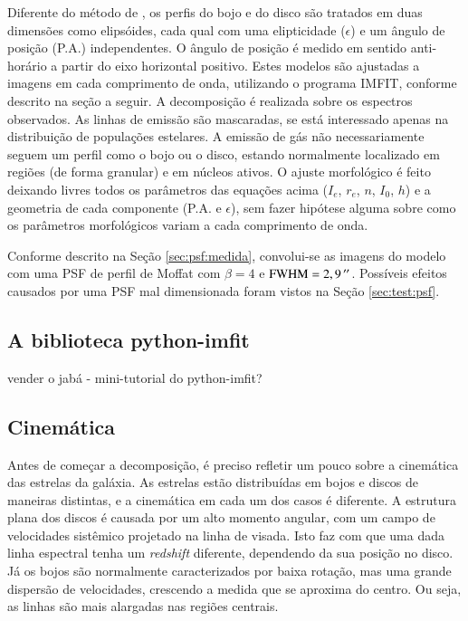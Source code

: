Diferente do método de \citeauthor{Johnston2012}, os perfis do bojo e do disco
são tratados em duas dimensões como elipsóides, cada qual com uma elipticidade
($\epsilon$) e um ângulo de posição (P.A.) independentes. O ângulo de posição é
medido em sentido anti-horário a partir do eixo horizontal positivo. Estes
modelos são ajustadas a imagens em cada comprimento de onda, utilizando o
programa IMFIT, conforme descrito na seção a seguir. A decomposição é realizada
sobre os espectros observados. As linhas de emissão são mascaradas, se está
interessado apenas na distribuição de populações estelares. A emissão de gás não
necessariamente seguem um perfil como o bojo ou o disco, estando normalmente
localizado em regiões \HII (de forma granular) e em núcleos ativos.
O ajuste morfológico é feito deixando livres todos os parâmetros das equações
acima ($I_e$, $r_e$, $n$, $I_0$, $h$) e a geometria de cada componente (P.A. e
$\epsilon$), sem fazer hipótese alguma sobre como os parâmetros
morfológicos variam a cada comprimento de onda.

Conforme descrito na Seção \ref{sec:psf:medida}, convolui-se as imagens do
modelo com uma PSF de perfil de Moffat com $\beta=4$ e
$\mathrm{FWHM}=2,9\,^{\prime\prime}$. Possíveis efeitos causados por uma PSF mal
dimensionada foram vistos na Seção \ref{sec:test:psf}.


\subsection{A biblioteca python-imfit}

\TODO vender o jabá - mini-tutorial do python-imfit?


\subsection{Cinemática}
\label{sec:Decomp:cinematica}

Antes de começar a decomposição, é preciso refletir um pouco sobre a cinemática
das estrelas da galáxia. As estrelas estão distribuídas em bojos e discos de
maneiras distintas, e a cinemática em cada um dos casos é diferente.
A estrutura plana dos discos é causada por um alto momento angular, com um campo
de velocidades sistêmico projetado na linha de visada. Isto faz com que uma dada
linha espectral tenha um {\em redshift} diferente, dependendo da sua posição no
disco. Já os bojos são normalmente caracterizados por baixa rotação, mas uma
grande dispersão de velocidades, crescendo a medida que se aproxima do centro.
Ou seja, as linhas são mais alargadas nas regiões centrais.

